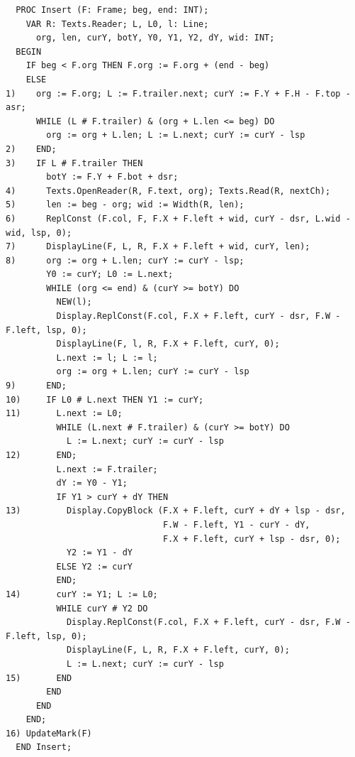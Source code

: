 \begin{verbatim}
  PROC Insert (F: Frame; beg, end: INT);
    VAR R: Texts.Reader; L, L0, l: Line;
      org, len, curY, botY, Y0, Y1, Y2, dY, wid: INT;
  BEGIN
    IF beg < F.org THEN F.org := F.org + (end - beg)
    ELSE
1)    org := F.org; L := F.trailer.next; curY := F.Y + F.H - F.top - asr;
      WHILE (L # F.trailer) & (org + L.len <= beg) DO
        org := org + L.len; L := L.next; curY := curY - lsp
2)    END;
3)    IF L # F.trailer THEN
        botY := F.Y + F.bot + dsr;
4)      Texts.OpenReader(R, F.text, org); Texts.Read(R, nextCh);
5)      len := beg - org; wid := Width(R, len);
6)      ReplConst (F.col, F, F.X + F.left + wid, curY - dsr, L.wid - wid, lsp, 0);
7)      DisplayLine(F, L, R, F.X + F.left + wid, curY, len);
8)      org := org + L.len; curY := curY - lsp;
        Y0 := curY; L0 := L.next;
        WHILE (org <= end) & (curY >= botY) DO
          NEW(l);
          Display.ReplConst(F.col, F.X + F.left, curY - dsr, F.W - F.left, lsp, 0);
          DisplayLine(F, l, R, F.X + F.left, curY, 0);
          L.next := l; L := l;
          org := org + L.len; curY := curY - lsp
9)      END;
10)     IF L0 # L.next THEN Y1 := curY;
11)       L.next := L0;
          WHILE (L.next # F.trailer) & (curY >= botY) DO
            L := L.next; curY := curY - lsp
12)       END;
          L.next := F.trailer;
          dY := Y0 - Y1;
          IF Y1 > curY + dY THEN
13)         Display.CopyBlock (F.X + F.left, curY + dY + lsp - dsr,
                               F.W - F.left, Y1 - curY - dY,
                               F.X + F.left, curY + lsp - dsr, 0);
            Y2 := Y1 - dY
          ELSE Y2 := curY
          END;
14)       curY := Y1; L := L0;
          WHILE curY # Y2 DO
            Display.ReplConst(F.col, F.X + F.left, curY - dsr, F.W - F.left, lsp, 0);
            DisplayLine(F, L, R, F.X + F.left, curY, 0);
            L := L.next; curY := curY - lsp
15)       END
        END
      END
    END;
16) UpdateMark(F)
  END Insert;
\end{verbatim}

